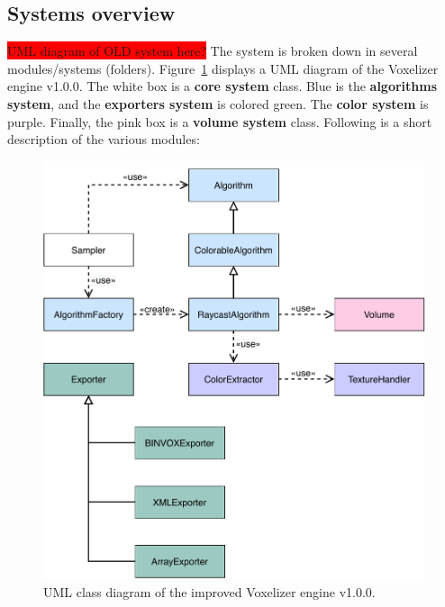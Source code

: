 \subsection{Systems overview}
\label{sec:method-implementation}
\colorbox{red}{UML diagram of OLD system here?}
The system is broken down in several modules/systems (folders). Figure~\ref{fig:uml-voxelizer-v1} displays a UML diagram of the Voxelizer engine v1.0.0. The white box is a \textbf{core system} class. Blue is the \textbf{algorithms system}, and the \textbf{exporters system} is colored green. The \textbf{color system} is purple. Finally, the pink box is a \textbf{volume system} class. Following is a short description of the various modules:
\begin{figure}[ht]
    \centering
    \includegraphics[scale=0.75]{sections/methodology/figures/uml/uml-voxelizer.pdf}
    \caption{UML class diagram of the improved Voxelizer engine v1.0.0.}
    \label{fig:uml-voxelizer-v1}
\end{figure}
